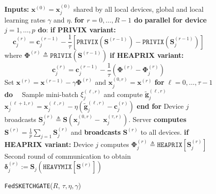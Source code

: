 \documentclass[11pt]{article}
\newcommand\DrawBox[3][]{%
  \begin{tikzpicture}[remember picture,overlay]
    \draw[overlay,fill=gray!30,#1] 
    ([xshift=10em,yshift=-0.4ex]{pic cs:#2}) 
    rectangle 
    ([xshift=-4pt,yshift=1.1ex]pic cs:#3);
  \end{tikzpicture}%
}
\newcommand\DrawBoxx[3][]{%
  \begin{tikzpicture}[remember picture,overlay]
    \draw[overlay,fill=gray!30,#1] 
    ([xshift=-8.0em,yshift=-1.0ex]{pic cs:#2}) 
    rectangle 
    ([xshift=50pt,yshift=-1.2ex]pic cs:#3);
  \end{tikzpicture}%
}
\begin{document}
\begin{figure}\vspace{-1.8cm}
\begin{minipage}{\linewidth}
\begin{algorithm}[H]
\caption{\texttt{FedSKETCHGATE}($R$, $\tau, \eta, \gamma$)}\label{Alg:PFLHet}
\begin{algorithmic}[1]
\STATE \textbf{Inputs:} $\boldsymbol{x}^{(0)}=\boldsymbol{x}^{(0)}_j$ shared by all local devices, global and local learning rates $\gamma$ and $\eta$.
\STATE \textbf{for $r=0, \ldots, R-1$ do}
\STATE   \textbf{parallel for device $j=1,\ldots,p$ do}:
\STATE  \hspace{0.02in} \textbf{if PRIVIX variant:} \label{line:cj_privix}
{\small$$\mathbf{c}_j^{(r)}=\mathbf{c}_j^{(r-1)}-\frac{1}{\tau}\left[{\texttt{PRIVIX}}\left(\mathbf{S}^{(r-1)}\right)-{\texttt{PRIVIX}}\left(\mathbf{S}^{(r-1)}_{j}\right)\right]$$} {\small where ${\mathbf{\Phi}}^{(r)}\triangleq \texttt{PRIVIX}(\mathbf{S}^{(r-1)})$}
\vspace{0.1cm}
\STATE  \hspace{0.02in} \textbf{if HEAPRIX variant:} 
{\small $$\mathbf{c}_j^{(r)}=\mathbf{c}_j^{(r-1)}-\frac{1}{\tau}\left(\mathbf{\Phi}^{(r)}-\mathbf{\Phi}^{(r)}_j\right)$$}
\STATE  Set $\boldsymbol{x}^{(r)}=\boldsymbol{x}^{(r-1)}-\gamma\mathbf{\Phi}^{(r)}$ and $\boldsymbol{x}_j^{(0,r)}=\boldsymbol{x}^{(r)}$ 
\STATE \hspace{0.02in} \textbf{for} $\ell=0,\ldots,\tau-1$ \textbf{do}
\STATE  $\quad  $Sample mini-batch $\xi_j^{(\ell,r)}$ and compute $\tilde{\mathbf{g}}_{j}^{(\ell,r)}$
\STATE $\quad  $$\boldsymbol{x}^{(\ell+1,r)}_{j}=\boldsymbol{x}^{(\ell,r)}_j-\eta \left( \tilde{\mathbf{g}}_{j}^{(\ell,r)}-\mathbf{c}_j^{(r)}\right)$ \label{eq:update-rule-alg-heter1}
\STATE \hspace{0.05in}\textbf{end for}
\STATE Device $j$ broadcasts $\mathbf{S}^{(r)}_{j}\triangleq\mathbf{S}\left(\boldsymbol{x}_j^{(0,r)}-~{\boldsymbol{x}}_{j}^{(\tau,r)}\right)$.
\STATE Server \textbf{computes} $ {\mathbf{S}}^{(r)}=\frac{1}{p}\sum_{j=1}\mathbf{S}^{(r)}_{j}$ and  \textbf{broadcasts} ${\mathbf{S}}^{(r)}$ to all devices.
\vspace{0.1cm}
\STATE  \hspace{0.04in}\textbf{if HEAPRIX variant:} 
\STATE  Device $j$ computes $\mathbf{\Phi}^{(r)}_j\triangleq \texttt{HEAPRIX}[\mathbf{S}_j^{(r)}]$
\STATE  Second round of communication to obtain $\mathbf{\delta}_j^{(r)} :=  \mathbf{S}_j\left(\texttt{HEAVYMIX}[\mathbf{S}^{(r)}]\right)$  \label{line:tildeS}
$$
\end{algorithmic}
\end{algorithm}
\end{minipage}
\end{figure}
\end{document}
